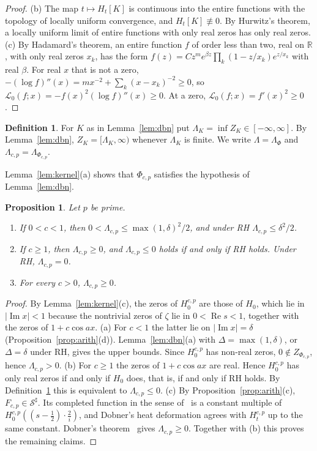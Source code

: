 \documentclass[11pt]{article}
\numberwithin{equation}{section}
\newtheorem{proposition}[theorem]{Proposition}
\theoremstyle{definition}
\newtheorem{definition}[theorem]{Definition}
\theoremstyle{remark}
\DeclareMathOperator{\Rea}{Re}
\DeclareMathOperator{\Ima}{Im}
\newcommand{\Lag}{\mathscr L_0}
\newcommand{\Sh}{\mathcal S^\sharp}
\begin{document}
\begin{proof}
(b) The map $t\mapsto H_t[K]$ is continuous into the entire functions with
the topology of locally uniform convergence, and $H_t[K]\not\equiv0$. By
Hurwitz's theorem, a locally uniform limit of entire functions with only real
zeros has only real zeros.
(c) By Hadamard's theorem, an entire function $f$ of order less than two,
real on $\mathbb R$, with only real zeros $x_k$, has the form
$f(z)=Cz^me^{\beta z}\prod_k(1-z/x_k)e^{z/x_k}$ with real $\beta$. For real
$x$ that is not a zero,
$-(\log f)''(x)=mx^{-2}+\sum_k(x-x_k)^{-2}\ge0$, so
$\Lag(f;x)=-f(x)^2(\log f)''(x)\ge0$. At a zero, $\Lag(f;x)=f'(x)^2\ge0$.
\end{proof}

\begin{definition}\label{def:Lambda}
For $K$ as in Lemma~\ref{lem:dbn} put $\Lambda_K=\inf Z_K\in[-\infty,\infty]$.
By Lemma~\ref{lem:dbn}, $Z_K=[\Lambda_K,\infty)$ whenever $\Lambda_K$ is
finite. We write $\Lambda=\Lambda_\Phi$ and $\Lambda_{c,p}=\Lambda_{\Phi_{c,p}}$.
\end{definition}

Lemma~\ref{lem:kernel}(a) shows that $\Phi_{c,p}$ satisfies the hypothesis of
Lemma~\ref{lem:dbn}.

\begin{proposition}\label{prop:basic}
Let $p$ be prime.
\begin{enumerate}[label=\textup{(\alph*)}]
\item If $0<c<1$, then $0<\Lambda_{c,p}\le\max(1,\delta)^2/2$, and under RH
$\Lambda_{c,p}\le\delta^2/2$.
\item If $c\ge1$, then $\Lambda_{c,p}\ge0$, and $\Lambda_{c,p}\le0$ holds if
and only if RH holds. Under RH, $\Lambda_{c,p}=0$.
\item For every $c>0$, $\Lambda_{c,p}\ge0$.
\end{enumerate}
\end{proposition}

\begin{proof}
By Lemma~\ref{lem:kernel}(c), the zeros of $H^{c,p}_0$ are those of $H_0$,
which lie in $|\Ima x|<1$ because the nontrivial zeros of $\zeta$ lie in
$0<\Rea s<1$, together with the zeros of $1+c\cos ax$.
(a) For $c<1$ the latter lie on $|\Ima x|=\delta$
(Proposition~\ref{prop:arith}(d)). Lemma~\ref{lem:dbn}(a) with
$\Delta=\max(1,\delta)$, or $\Delta=\delta$ under RH, gives the upper bounds.
Since $H^{c,p}_0$ has non-real zeros, $0\notin Z_{\Phi_{c,p}}$, hence
$\Lambda_{c,p}>0$.
(b) For $c\ge1$ the zeros of $1+c\cos ax$ are real. Hence $H^{c,p}_0$ has only
real zeros if and only if $H_0$ does, that is, if and only if RH holds. By
Definition~\ref{def:Lambda} this is equivalent to $\Lambda_{c,p}\le0$.
(c) By Proposition~\ref{prop:arith}(c), $F_{c,p}\in\Sh$. Its completed
function in the sense of~\cite[Section~2]{dobner} is a constant multiple of
$H^{c,p}_0((s-\tfrac12)\cdot\tfrac2i)$, and Dobner's heat deformation agrees
with $H^{c,p}_t$ up to the same constant. Dobner's theorem~\cite[Theorem~2]{dobner}
gives $\Lambda_{c,p}\ge0$. Together with (b) this proves the remaining claims.
\end{proof}
\end{document}
